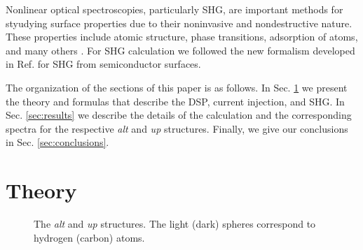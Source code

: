 \documentclass[pss]{wiley2sp} %
\begin{document}

Nonlinear optical spectroscopies, particularly SHG, are important methods for
styudying surface properties due to their noninvasive and nondestructive
nature. These properties include atomic structure, phase transitions,
adsorption of atoms, and many others \cite{dadap1997second,%
daum1993identification,mcgilp1994probing,power1995resonant,%
godefroy1996electric,salazar2014molecular,chen1981surface,%
mendoza1998microscopic}. For SHG calculation we followed
the new formalism developed in Ref. \cite{anderson2015theory} for SHG from
semiconductor surfaces.

The organization of the sections of this paper is as follows. In Sec.
\ref{sec:theory} we present the theory and formulas that describe the DSP,
current injection, and SHG. In Sec. \ref{sec:results} we describe the details
of the calculation and the corresponding spectra for the respective \emph{alt}
and \emph{up} structures. Finally, we give our conclusions in Sec.
\ref{sec:conclusions}.


\section{Theory}\label{sec:theory}

\begin{figure}[t]
\hfill
{}
\caption{The \emph{alt} and \emph{up} structures. The light
(dark) spheres correspond to hydrogen (carbon) atoms.\label{fig:structures}}
\end{figure}
\end{document}
